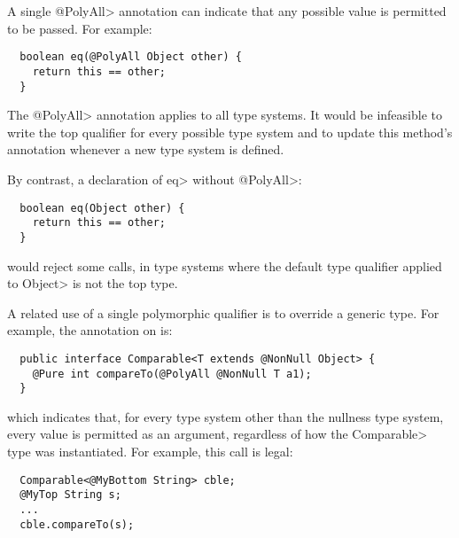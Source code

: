 A single \<@PolyAll> annotation can indicate that any possible value is
permitted to be passed.  For example:

\begin{Verbatim}
  boolean eq(@PolyAll Object other) {
    return this == other;
  }
\end{Verbatim}

\noindent
The \<@PolyAll> annotation applies to all type systems.
It would be infeasible to write the top qualifier for every possible type
system and to update this method's annotation whenever a new type system is
defined.

By contrast, a declaration of \<eq> without \<@PolyAll>:

\begin{Verbatim}
  boolean eq(Object other) {
    return this == other;
  }
\end{Verbatim}

\noindent
would reject some calls, in type systems where the default type qualifier
applied to \<Object> is not the top type.

A related use of a single polymorphic qualifier is to override a generic
type.  For example, the annotation on
is:

\begin{Verbatim}
  public interface Comparable<T extends @NonNull Object> {
    @Pure int compareTo(@PolyAll @NonNull T a1);
  }
\end{Verbatim}

\noindent
which indicates that, for every type system other than the nullness type
system, every value is permitted as an argument, regardless of how the
\<Comparable> type was instantiated.  For example, this call is legal:

\begin{Verbatim}
  Comparable<@MyBottom String> cble;
  @MyTop String s;
  ...
  cble.compareTo(s);
\end{Verbatim}


